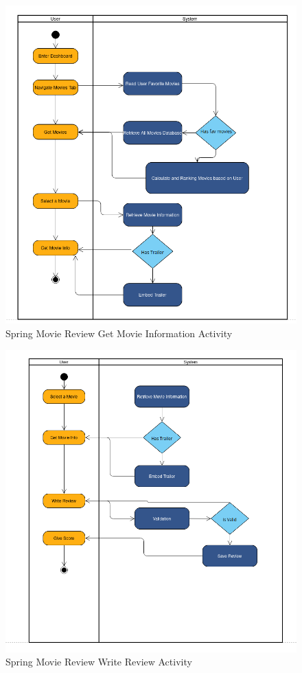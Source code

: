 \documentclass[12pt]{article}
\begin{document}
\begin{figure}[H]
    \centering
    \includegraphics[scale=0.7]{Figs/Get_Movie_Activity.png}
    \caption{Spring Movie Review Get Movie Information Activity}
\end{figure}
\begin{figure}[H]
    \centering
    \includegraphics[scale=0.7]{Figs/Review_Activity.png}
    \caption{Spring Movie Review Write Review Activity}
\end{figure}
\end{document}

